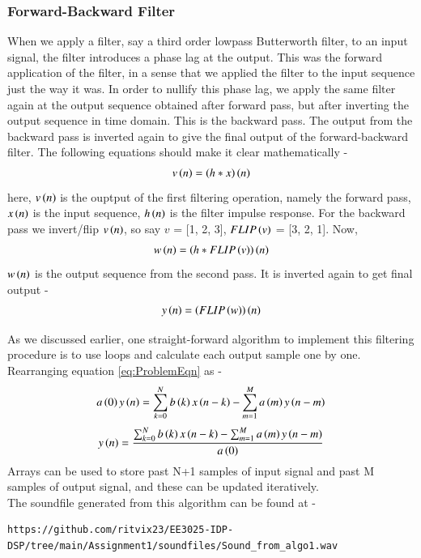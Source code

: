 \documentclass[journal,12pt,twocolumn]{IEEEtran}
\begin{document}
  \subsubsection{Forward-Backward Filter}
  When we apply a filter, say a third order lowpass Butterworth filter, to an input signal, the filter introduces a phase lag at the output. This was the forward application of the filter, in a sense that we applied the filter to the input sequence just the way it was. In order to nullify this phase lag, we apply the same filter again at the output sequence obtained after forward pass, but after inverting the output sequence in time domain. This is the backward pass. The output from the backward pass is inverted again to give the final output of the forward-backward filter. The following equations should make it clear mathematically - 
  \begin{align}
      v\left(n\right)=\left(h*x\right)\left(n\right)
  \end{align}
  here, $v\left(n\right)$ is the ouptput of the first filtering operation, namely the forward pass, $x\left(n\right)$ is the input sequence, $h\left(n\right)$ is the filter impulse response. For the backward pass we invert/flip $v\left(n\right)$, so say $v$ = [1, 2, 3], $FLIP\left(v\right)$  = [3, 2, 1]. Now, 
  \begin{align} 
      w\left(n\right)=\left(h*FLIP\left(v\right)\right)\left(n\right)
  \end{align}
  $w\left(n\right)$ is the output sequence from the second pass. It is inverted again to get final output - 
  \begin{align}\label{eq:Forward-Backward_eqn}
      y\brak{n}=\brak{FLIP\brak{w}}\brak{n}
  \end{align}

  As we discussed earlier, one straight-forward algorithm to implement this filtering procedure is to use loops and calculate each output sample one by one. Rearranging equation \ref{eq:ProblemEqn} as -
  \begin{align}
        a\left(0\right)y\left(n\right)=\sum _{k=0}^{N}b\left(k\right)x\left(n-k\right) - \sum _{m=1}^{M}a\left(m\right)y\left(n-m\right)
    \end{align}
    \begin{align} \label{eq:Modified_eqn}
        y\brak{n}=\frac{\sum _{k=0}^{N}b\brak{k}x\brak{n-k} - \sum _{m=1}^{M}a\brak{m}y\brak{n-m}}{a\brak{0}}
    \end{align}
  Arrays can be used to store past N+1 samples of input signal and past M samples of output signal, and these can be updated iteratively.
  \\
  The soundfile generated from this algorithm can be found at - 
  \begin{lstlisting}
https://github.com/ritvix23/EE3025-IDP-DSP/tree/main/Assignment1/soundfiles/Sound_from_algo1.wav
  \end{lstlisting}
\end{document}
